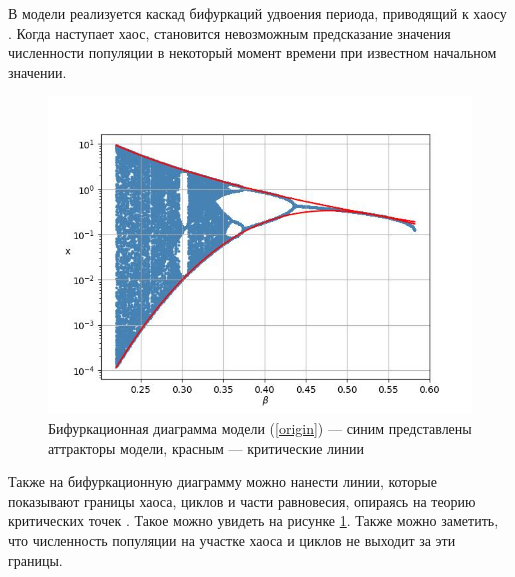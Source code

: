     В модели реализуется каскад бифуркаций удвоения периода, приводящий к хаосу \cite[стр. 33]{elementsOfNonlinearDynamic}. Когда наступает хаос, становится невозможным предсказание значения численности популяции в некоторый момент времени при известном начальном значении.
        
    \begin{figure}
        \centering
        \includegraphics[width=\textwidth]{deterministic/images/bifurcation_chaos.jpg}

        \captionsetup{justification=centering}
        \caption{Бифуркационная диаграмма модели (\ref{origin}) --- синим представлены аттракторы модели, красным --- критические линии }
        \label{bifurcation_chaos}
    \end{figure}
        
    Также на бифуркационную диаграмму можно нанести линии, которые показывают границы хаоса, циклов и части равновесия, опираясь на теорию критических точек \cite{nonsmoothOneDimensionalMapsSomeBasicConceptsAndDefinitions}. Такое можно увидеть на рисунке \ref{bifurcation_chaos}. Также можно заметить, что численность популяции на участке хаоса и циклов не выходит за эти границы.
        
